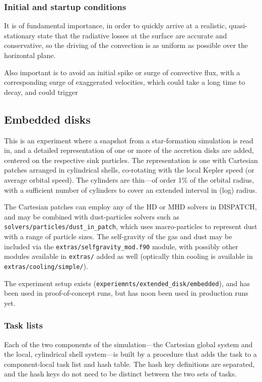 \documentclass[paper=a4,fontsize=11pt]{scrartcl}
\numberwithin{equation}{section}		%
\numberwithin{figure}{section}			%
\numberwithin{table}{section}				%
\newcommand{\filecolor}{\color{NavyBlue}}
\newcommand{\File}[1]{{\filecolor\texttt{#1}}}
\begin{document}
\subsubsection{Initial and startup conditions}
It is of fundamental importance, in order to quickly arrive at a realistic, quasi-stationary state that the radiative losses at the surface are accurate and conservative, so the driving of the convection is as uniform as possible over the horizontal plane.

Also important is to avoid an initial spike or surge of convective flux, with a corresponding surge of exaggerated velocities, which could take a long time to decay, and could trigger

\subsection{Embedded disks}
This is an experiment where a snapshot from a star-formation simulation is read in, and a detailed representation of one or more of the accretion disks are added, centered on the respective sink particles.  The representation is one with Cartesian patches arranged in cylindrical shells, co-rotating with the local Kepler speed (or average orbital speed).  The cylinders are thin---of order 1\% of the orbital radius, with a sufficient number of cylinders to cover an extended interval in (log) radius.

The Cartesian patches can employ any of the HD or MHD solvers in DISPATCH, and may be combined with dust-particles solvers such as \File{solvers/particles/dust\_in\_patch}, which uses macro-particles to represent dust with a range of particle sizes. The self-gravity of the gas and dust may be included via the \File{extras/selfgravity\_mod.f90} module, with possibly other modules available in \File{extras/} added as well (optically thin cooling is available in \File{extras/cooling/simple/}).

The experiment setup exists (\verb|experiemnts/extended_disk/embedded|), and has been used in proof-of-concept runs, but has noon been used in production runs yet.

\subsubsection{Task lists}
Each of the two components of the simulation---the Cartesian global system and the local, cylindrical shell system---is built by a procedure that adds the task to a component-local task list and hash table.  The hash key definitions are separated, and the hash keys do not need to be distinct between the two sets of tasks.
\end{document}
